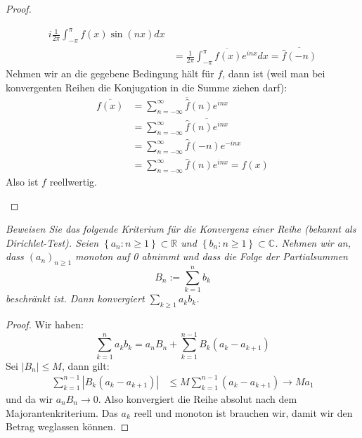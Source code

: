 \documentclass[11pt]{article}
\newenvironment{problem}[2][Beispiel]{
    \begin{trivlist}
        \item[\hskip \labelsep {\bfseries #1}\hskip \labelsep {\bfseries #2.}] \itshape}{
    \end{trivlist}\normalshape
}
\begin{document}
\begin{proof}
\begin{enumerate}[label = (\alph*)]
$$\begin{aligned}
              i\frac{1}{2\pi}\int_{-\pi}^{\pi} f(x)\sin(nx)dx\\&=
              \overline{\frac{1}{2\pi}\int_{-\pi}^{\pi} f(x)e^{inx}dx} = \overline{\hat{f}(-n)}
        \end{aligned}$$
        Nehmen wir an die gegebene Bedingung hält für $f$, dann ist
        (weil man bei konvergenten Reihen die Konjugation in die Summe ziehen darf):
        $$\begin{aligned}
              \overline{f(x)} &= \overline{\sum_{n=-\infty}^{\infty} \hat{f}(n)e^{inx}}\\&=
              \sum_{n=-\infty}^{\infty} \overline{\hat{f}(n)e^{inx}}\\
              &=\sum_{n=-\infty}^{\infty}\hat{f}(-n) e^{-inx}\\
              &= \sum_{n=-\infty}^{\infty} \hat{f}(n)e^{inx} = f(x)
        \end{aligned}$$
        Also ist $f$ reellwertig.
        \end{enumerate}
    \end{proof}

    \begin{problem}{2}
        Beweisen Sie das folgende Kriterium für die Konvergenz einer Reihe (bekannt als Dirichlet-Test).
        Seien $\left\{a_n: n \geq 1\right\} \subset \mathbb{R}$ und $\left\{b_n: n \geq 1\right\} \subset
        \mathbb{C}$. Nehmen wir an, dass $\left(a_n\right)_{n \geq 1}$ monoton auf 0 abnimmt und dass
        die Folge der Partialsummen
        $$
        B_n:=\sum_{k=1}^n b_k
        $$
        beschränkt ist. Dann konvergiert $\sum_{k \geq 1} a_k b_k$.
    \end{problem}

    \begin{proof}
        Wir haben:
        $$\sum_{k=1}^n a_kb_k = a_nB_n+ \sum_{k=1}^{n-1}B_k(a_k-a_{k+1})$$
        Sei $|B_n|\leq M$, dann gilt:
        $$\begin{aligned}
              \sum_{k=1}^{n-1}|B_k(a_k-a_{k+1})| &\leq M \sum_{k=1}^{n-1}(a_k-a_{k+1})\to Ma_1
        \end{aligned}$$
        und da wir $a_{n}B_n\to 0$. Also konvergiert die Reihe absolut nach dem Majorantenkriterium.
        Das $a_k$ reell und monoton ist brauchen wir, damit wir den Betrag weglassen können.
    \end{proof}
\end{document}
